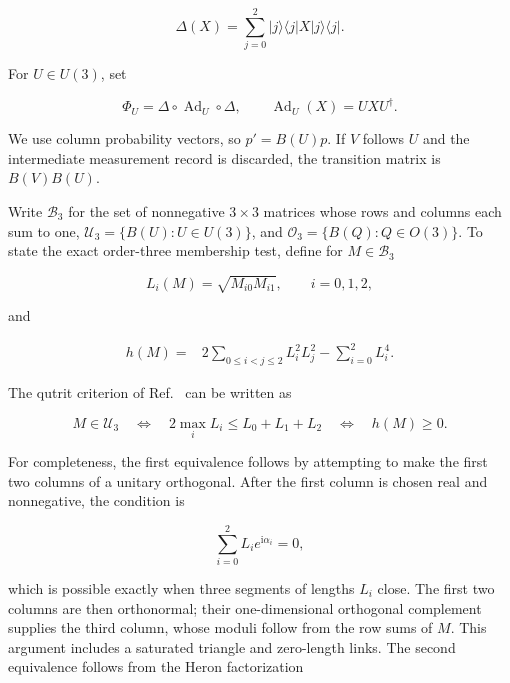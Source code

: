 \documentclass[aip,jmp,amsmath,amssymb,preprint,nofootinbib]{revtex4-2}
\newcommand{\Bd}{\mathcal{B}_3}
\newcommand{\Ud}{\mathcal{U}_3}
\newcommand{\Od}{\mathcal{O}_3}
\newcommand{\Ad}{\operatorname{Ad}}
\begin{document}
\begin{equation}
 \Delta(X)=\sum_{j=0}^2 |j\rangle\!\langle j|X|j\rangle\!\langle j|.
 \label{eq:dephase}
\end{equation}

For $U\in U(3)$, set

\begin{equation}
 \Phi_U=\Delta\circ\Ad_U\circ\Delta,
 \qquad \Ad_U(X)=UXU^\dagger.
 \label{eq:channel}
\end{equation}

We use column probability vectors, so $p'=B(U)p$.  If $V$ follows $U$ and
the intermediate measurement record is discarded, the transition matrix is
$B(V)B(U)$.

Write $\Bd$ for the set of nonnegative $3\times3$ matrices whose rows and
columns each sum to one, $\Ud=\{B(U):U\in U(3)\}$, and
$\Od=\{B(Q):Q\in O(3)\}$.  To state the exact order-three membership test,
define for $M\in\Bd$

\begin{equation}
 L_i(M)=\sqrt{M_{i0}M_{i1}},\qquad i=0,1,2,
 \label{eq:links}
\end{equation}

and

\begin{align}
 h(M)={}&2\!\sum_{0\leq i<j\leq2}L_i^2L_j^2
        -\sum_{i=0}^2L_i^4.                        \label{eq:hdef}
\end{align}

The qutrit criterion of Ref.~\cite{Bengtsson2005} can be written as

\begin{equation}
 M\in\Ud
 \quad\Longleftrightarrow\quad
 2\max_i L_i\leq L_0+L_1+L_2
 \quad\Longleftrightarrow\quad h(M)\geq0.
 \label{eq:qutritcriterion}
\end{equation}

For completeness, the first equivalence follows by attempting to make the
first two columns of a unitary orthogonal.  After the first column is chosen
real and nonnegative, the condition is

\begin{equation}
 \sum_{i=0}^2 L_i e^{\mathrm{i}\alpha_i}=0,
 \label{eq:phasetriangle}
\end{equation}

which is possible exactly when three segments of lengths $L_i$ close.  The
first two columns are then orthonormal; their one-dimensional orthogonal
complement supplies the third column, whose moduli follow from the row sums
of $M$.  This argument includes a saturated triangle and zero-length links.
The second equivalence follows from the Heron factorization
\end{document}
